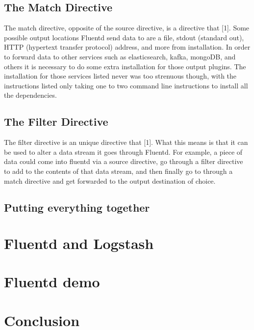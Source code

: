 \subsection{The Match Directive}
\quad \quad The match directive, opposite of the source directive, is a directive that [1]. Some possible output locations Fluentd 
send data to are a file, stdout (standard out), HTTP (hypertext transfer protocol) address, and more from installation. In order to forward data to
other services such as elasticsearch, kafka, mongoDB, and others it is necessary to do some extra installation for those output plugins. The installation for those services
listed never was too strenuous though, with the instructions listed only taking one to two command line instructions to install all the dependencies.
\subsection{The Filter Directive}
\quad \quad The filter directive is an unique directive that [1]. What this means is that it can be used to alter a data stream
it goes through Fluentd. For example, a piece of data could come into fluentd via a source directive, go through a filter directive to add to the contents of that data stream, and
then finally go to through a match directive and get forwarded to the output destination of choice.
\subsection{Putting everything together}
\section{Fluentd and Logstash} \label{sec:comp}
\quad \quad
\section{Fluentd demo} \label{sec:demo}
\quad \quad 
\section{Conclusion} \label{sec:conclude}
\quad \quad 
\newpage
\begin{thebibliography}{widest entry}
\end{thebibliography}